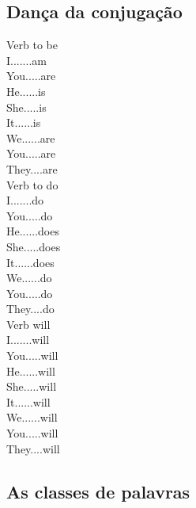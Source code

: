\documentclass[12pt,a4paper]{article} %
\begin{document}
\subsection{Dança da conjugação}

Verb to be\\

I.......am\\

You.....are\\

He......is\\
She.....is\\
It......is\\

We......are\\

You.....are\\

They....are\\

Verb to do\\

I.......do\\

You.....do\\

He......does\\
She.....does\\
It......does\\

We......do\\

You.....do\\

They....do\\

Verb will\\

I.......will\\

You.....will\\

He......will\\
She.....will\\
It......will\\

We......will\\

You.....will\\

They....will\\




\subsection{As classes de palavras}
\end{document}

